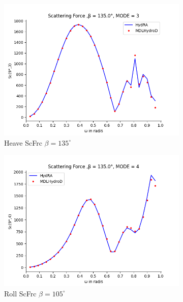 \begin{figure}[H]
    \vspace{5pt}%
    \begin{subfigure}[b]{0.45\textwidth}
        \includegraphics[width=\textwidth]{plots/kcs/sc/sc3.png}
        \caption{Heave ScFrc $\beta = 135^{\circ}$}
    \end{subfigure}
    \begin{subfigure}[b]{0.45\textwidth}
        \includegraphics[width=\textwidth]{plots/kcs/sc/sc4.png}
        \caption{Roll ScFrc $\beta = 105^{\circ}$}
    \end{subfigure}
    \vspace{5pt}%
    \begin{subfigure}[b]{0.45\textwidth}

\end{subfigure}
\end{figure}
